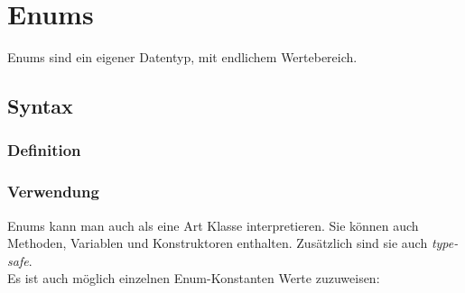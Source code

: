 \section{Enums}
Enums sind ein eigener Datentyp, mit endlichem Wertebereich.
\subsection{Syntax}
\vspace{-0.8\abovedisplayskip}
\begin{minipage}[t]{0.49\columnwidth}
    \subsubsection{Definition}
    
\end{minipage}\hfill
\begin{minipage}[t]{0.49\columnwidth}
    \subsubsection{Verwendung}
    
\end{minipage}
Enums kann man auch als eine Art Klasse interpretieren. Sie können auch Methoden, Variablen und Konstruktoren enthalten. 
Zusätzlich sind sie auch \textit{type-safe}.\\
Es ist auch möglich einzelnen Enum-Konstanten Werte zuzuweisen:

